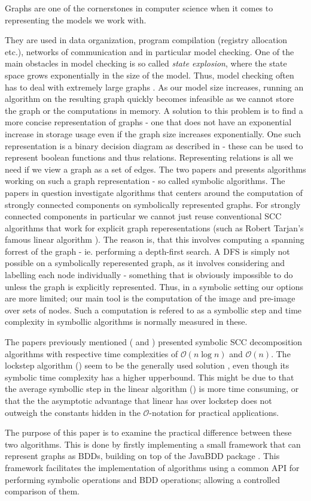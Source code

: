 \documentclass[../master/master.tex]{subfiles}
\begin{document}
Graphs are one of the cornerstones in computer science when it comes to representing the models we work with. 

They are used in data organization,  program compilation (registry allocation etc.), networks of communication and in particular model checking. One of the main obstacles in model checking is so called \textit{state explosion}, where the state space grows exponentially in the size of the model. Thus, model checking often has to deal with extremely large graphs \cite{pelanek_2004}. As our model size increases, running an algorithm on the resulting graph quickly becomes infeasible as we cannot store the graph or the computations in memory. A solution to this problem is to find a more concise representation of graphs - one that does not have an exponential increase in storage usage even if the graph size increases exponentially. One such representation is a binary decision diagram as described in \cite{bryant_1992} - these can be used to represent boolean functions and thus relations. Representing relations is all we need if we view a graph as a set of edges. The two papers \cite{linear} and \cite{lockstep} presents algorithms working on such a graph representation - so called symbolic algorithms. The papers in question investigate algorithms that centers around the computation of strongly connected components on symbolically represented graphs. For strongly connected components in particular we cannot just reuse conventional SCC algorithms that work for explicit graph reperesentations (such as Robert Tarjan's famous linear algorithm \cite{tarjan_1971}). The reason is, that this involves computing a spanning forrest of the graph - ie. performing a depth-first search. A DFS is simply not possible on a symbolically reperesented graph, as it involves considering and labelling each node individually - something that is obviously impossible to do unless the graph is explicitly represented. Thus, in a symbolic setting our options are more limited; our main tool is the computation of the image and pre-image over sets of nodes. Such a computation is refered to as a symbollic step and time complexity in symbollic algorithms is normally measured in these.

The papers previously mentioned (\cite{linear} and \cite{lockstep}) presented symbolic SCC decomposition algorithms with respective time complexities of $\mathcal{O}(n \log n)$ and $\mathcal{O}(n)$. The lockstep algorithm (\cite{lockstep}) seem to be the generally used solution , even though its symbolic time complexity has a higher upperbound. This might be due to that the average symbollic step in the linear algorithm (\cite{linear}) is more time consuming, or that the the asymptotic advantage that linear has over lockstep does not outweigh the constants hidden in the $\mathcal{O} $-notation for practical applications.

The purpose of this paper is to examine the practical difference between these two algorithms. This is done by firstly implementing a small framework that can represent graphs as BDDs, building on top of the JavaBDD package \cite{whaley}. This framework facilitates the implementation of algorithms using a common API for performing symbolic operations and BDD operations; allowing a controlled comparison of them. 
\end{document}
